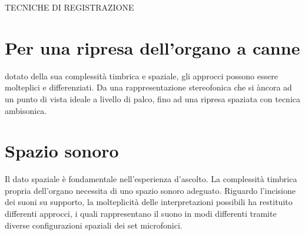 \newcommand{\mylanguages}{italian,english} %
\newcommand{\mytitle}{Tecniche di Ripresa e Registrazione Audio}
\newcommand{\mysubtitle}{Pratiche sperimentali di registrazione dell'organo a canne, \\ differenti approcci di ripresa del suono}
\newcommand{\authorone}{Doralma A. Palestra}
\newcommand{\institutione}{Conservatorio N. Piccinni di Bari}
\newcommand{\emailone}{doralma.palestra@gmail.com}




\maketitle TECNICHE DI REGISTRAZIONE
\thispagestyle{empty}
\section*{Per una ripresa dell'organo a canne}
dotato della sua complessità timbrica e spaziale, 
gli approcci possono essere molteplici e differenziati.
Da una rappresentazione stereofonica che si àncora ad un punto di 
vista ideale a livello di palco, fino ad una ripresa spaziata con tecnica 
ambisonica.

\section*{Spazio sonoro}
Il dato spaziale è fondamentale nell'esperienza d'ascolto. La complessità
 timbrica propria dell'organo necessita di uno spazio sonoro adeguato. 
 Riguardo l'incisione dei suoni su supporto, la molteplicità delle 
 interpretazioni possibili ha restituito differenti approcci, i quali 
 rappresentano il suono in modi differenti tramite diverse configurazioni
  spaziali dei set microfonici.   %
